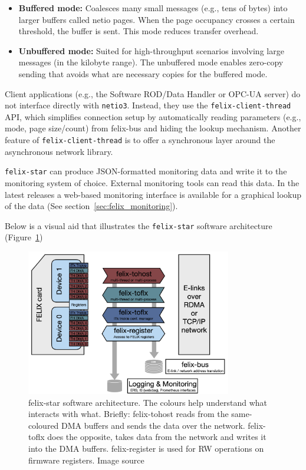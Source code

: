 \begin{itemize}
    \item \textbf{Buffered mode:} Coalesces many small messages (e.g., tens of bytes) into larger buffers called netio pages. When the page occupancy crosses a certain threshold, the buffer is sent. This mode reduces transfer overhead.
    \item \textbf{Unbuffered mode:} Suited for high-throughput scenarios involving large messages (in the kilobyte range). The unbuffered mode enables zero-copy sending that avoids what are necessary copies for the buffered mode.
\end{itemize}

Client applications (e.g., the Software ROD/Data Handler \cite{swrod-repository} or \acs{OPC-UA} \cite{opc-ua} server) do not interface directly with \texttt{netio3}. Instead, they use the \texttt{felix-client-thread} \acs{API}, which simplifies connection setup by automatically reading parameters (e.g., mode, page size/count) from felix-bus and hiding the lookup mechanism. Another feature of \texttt{felix-client-thread} is to offer a synchronous layer around the asynchronous network library.

\texttt{felix-star} can produce JSON-formatted monitoring data and write it to the monitoring system of choice. External monitoring tools can read this data. In the latest releases a web-based monitoring interface is available for a graphical lookup of the data (See section~\ref{sec:felix_monitoring}).

Below is a visual aid that illustrates the \texttt{felix-star} software architecture (Figure~\ref{fig:felix-star})

\begin{figure}[htbp]
\centering
\includegraphics[width=0.8\textwidth]{images/felix/felix-star-architecture.png}
\caption[felix-star software architecture]{felix-star software architecture. The colours help understand what interacts with what. Briefly: felix-tohost reads from the same-coloured DMA buffers and sends the data over the network. felix-toflx does the opposite, takes data from the network and writes it into the DMA buffers. felix-register is used for RW operations on firmware registers. Image source \cite{felix-user-manual}}
\label{fig:felix-star}
\end{figure}

